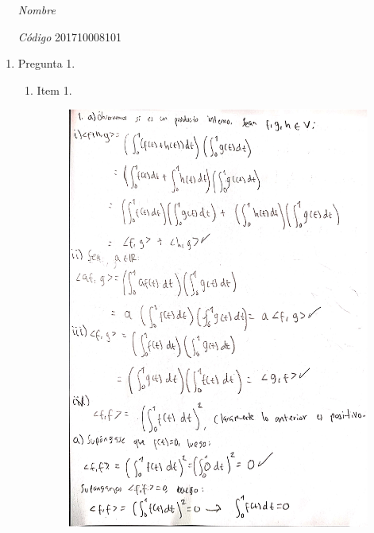 \documentclass[fleqn]{article}
\begin{document}
 \vspace{0.3cm}
   \begin{itemize}[leftmargin=6.25cm, labelsep=0.5cm]

     \item[\textit{Nombre}]  %
     \item[\textit{Código}] 201710008101 %

   \end{itemize}

   \begin{enumerate}
     \item Pregunta 1.
       \begin{enumerate}
         \item Item 1.
         \begin{figure}[H]
           \centering
           \includegraphics[scale=.6]{figs/1a1}

\end{figure}
\end{enumerate}
\end{enumerate}
\end{document}
